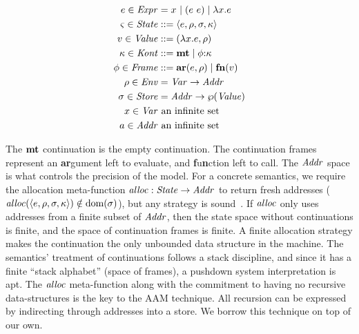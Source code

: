 {
\setlength{\abovedisplayskip}{0pt}
\setlength{\belowdisplayskip}{4pt}
\setlength{\abovedisplayshortskip}{0pt}
\setlength{\belowdisplayshortskip}{8pt}
\begin{align*}
  e \in \mathit{Expr} &= x^{{}} \mathrel{\mid} (e\ e){} \mathrel{\mid} \lambda{} x. e \\
  \varsigma \in \mathit{State} &::= \langle e,\rho,\sigma,\kappa \rangle \\
  v \in \mathit{Value} &::= (\lambda{} x. e, \rho) \\
  \kappa \in \mathit{Kont} &::= \mathbf{mt} \mathrel{\mid} \phi{\tt :} \kappa \\
  \phi \in \mathit{Frame} &::= \mathbf{ar}{}(e,\rho) \mathrel{\mid} \mathbf{fn}{}(v) \\
  \rho \in \mathit{Env} &= \mathit{Var} \to \mathit{Addr} \\
  \sigma \in \mathit{Store} &= \mathit{Addr} \to \wp(\mathit{Value}) \\
  x \in \mathit{Var} &\text{ an infinite set} \\
  a \in \mathit{Addr} &\text{ an infinite set}
\end{align*}
}

%
The $\mathbf{mt}$ continuation is the empty continuation.
%
The continuation frames represent an \textbf{ar}gument left to evaluate, and \textbf{f}u\textbf{n}ction left to call.
%
%
The $\mathit{Addr}$ space is what controls the precision of the model.
%
For a concrete semantics, we require the allocation meta-function $\mathit{alloc} :
\mathit{State} \to \mathit{Addr}$ to return fresh addresses ($\mathit{alloc}(\langle e,\rho,\sigma,\kappa \rangle) \notin \text{dom}(\sigma)$), but any strategy is sound~\citep{dvanhorn:Might2009Posteriori}.
%
If $\mathit{alloc}$ only uses addresses from a finite subset of $\mathit{Addr}$, then the state space without continuations is finite, and the space of continuation frames is finite.
%
A finite allocation strategy makes the continuation the only unbounded data structure in the machine.
%
The semantics' treatment of continuations follows a stack discipline, and since it has a finite ``stack alphabet'' (space of frames), a pushdown system interpretation is apt.
%
The $\mathit{alloc}$ meta-function along with the commitment to having no recursive data-structures is the key to the AAM technique.
%
All recursion can be expressed by indirecting through addresses into a store.
%
We borrow this technique on top of our own.


